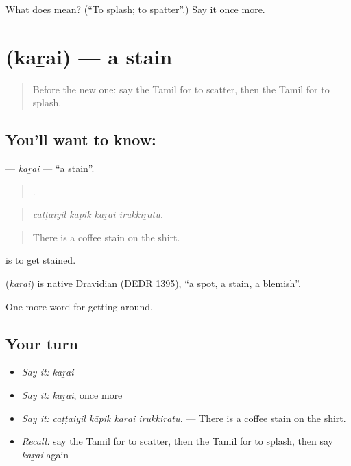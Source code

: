 \begin{tcolorbox}[breakable,colback=teal!4,colframe=teal!35!black,title={Before you move on}]
What does  mean? (\textquotedblleft{}To splash; to spatter\textquotedblright{}.) Say it once more.
\end{tcolorbox}
\section[\texorpdfstring{\ta{கறை} (kaṟai)}{கறை (kaṟai)}]{ (kaṟai) — a stain}

\label{lesson:TA-C444-karai-stain}



\begin{quote}
Before the new one: say the Tamil for to scatter, then the Tamil for to splash.
\end{quote}

\subsection*{You'll want to know: }
\textbf{} — \emph{kaṟai} — \textquotedblleft{}a stain\textquotedblright{}.

\begin{quote}
   .
\end{quote}

\begin{quote}
\emph{caṭṭaiyil kāpik kaṟai irukkiṟatu.}
\end{quote}

\begin{quote}
There is a coffee stain on the shirt.
\end{quote}

  is to get stained.

\begin{cousinweb}
\textbf{} (\emph{kaṟai}) is native Dravidian (DEDR 1395), \textquotedblleft{}a spot, a stain, a blemish\textquotedblright{}.
\end{cousinweb}

\begin{grammarlens}[title={What you've built}]
One more word for getting around.
\end{grammarlens}

\subsection*{Your turn}
\begin{itemize}
\raggedright
  \item \emph{Say it:} \emph{kaṟai}
  \item \emph{Say it:} \emph{kaṟai}, once more
  \item \emph{Say it:} \emph{caṭṭaiyil kāpik kaṟai irukkiṟatu.} — There is a coffee stain on the shirt.
  \item \emph{Recall:} say the Tamil for to scatter, then the Tamil for to splash, then say \emph{kaṟai} again
\end{itemize}

